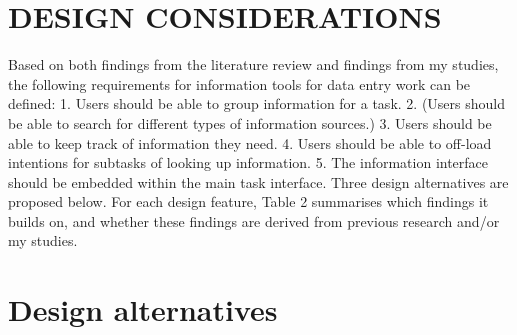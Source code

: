 \section{DESIGN CONSIDERATIONS}
Based on both findings from the literature review and findings from my studies, the following requirements for information tools for data entry work can be defined:
1.	Users should be able to group information for a task.
2.	(Users should be able to search for different types of information sources.)
3.	Users should be able to keep track of information they need.
4.	Users should be able to off-load intentions for subtasks of looking up information.
5.	The information interface should be embedded within the main task interface. 
Three design alternatives are proposed below. For each design feature, Table 2 summarises which findings it builds on, and whether these findings are derived from previous research and/or my studies.

\section{Design alternatives}